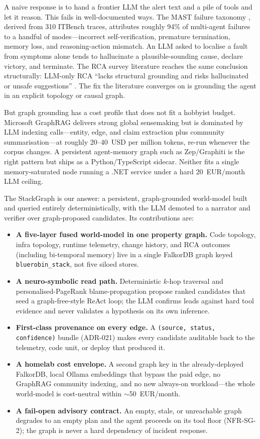 \documentclass[11pt]{article}
\begin{document}
A naive response is to hand a frontier LLM the alert text and a pile of tools
and let it reason. This fails in well-documented ways. The MAST failure taxonomy
\citep{cemri2025mast}, derived from 310 ITBench traces, attributes roughly 94\%
of multi-agent failures to a handful of modes---incorrect self-verification,
premature termination, memory loss, and reasoning-action mismatch. An LLM asked
to localise a fault from symptoms alone tends to hallucinate a plausible-sounding
cause, declare victory, and terminate. The RCA survey literature reaches the same
conclusion structurally: LLM-only RCA ``lacks structural grounding and risks
hallucinated or unsafe suggestions'' \citep{zhang2024survey}. The fix the
literature converges on is grounding the agent in an explicit topology or causal
graph.

But graph grounding has a cost profile that does not fit a hobbyist budget.
Microsoft GraphRAG \citep{edge2024graphrag} delivers strong global sensemaking
but is dominated by LLM indexing calls---entity, edge, and claim extraction plus
community summarisation---at roughly 20--40~USD per million tokens, re-run
whenever the corpus changes. A persistent agent-memory graph such as Zep/Graphiti
\citep{rasmussen2025zep} is the right pattern but ships as a Python/TypeScript
sidecar. Neither fits a single memory-saturated node running a .NET service under
a hard 20~EUR/month LLM ceiling.

The StackGraph is our answer: a persistent, graph-grounded world-model built and
queried entirely deterministically, with the LLM demoted to a narrator and
verifier over graph-proposed candidates. Its contributions are:

\begin{itemize}
  \item \textbf{A five-layer fused world-model in one property graph.} Code
  topology, infra topology, runtime telemetry, change history, and RCA outcomes
  (including bi-temporal memory) live in a single FalkorDB graph keyed
  \texttt{bluerobin\_stack}, not five siloed stores.
  \item \textbf{A neuro-symbolic read path.} Deterministic $k$-hop traversal and
  personalised-PageRank blame-propagation propose ranked candidates that seed a
  graph-free-style ReAct loop; the LLM confirms leads against hard tool evidence
  and never validates a hypothesis on its own inference.
  \item \textbf{First-class provenance on every edge.} A
  \texttt{(source, status, confidence)} bundle (ADR-021) makes every candidate
  auditable back to the telemetry, code unit, or deploy that produced it.
  \item \textbf{A homelab cost envelope.} A second graph key in the
  already-deployed FalkorDB, local Ollama embeddings that bypass the paid edge,
  no GraphRAG community indexing, and no new always-on workload---the whole
  world-model is cost-neutral within $\sim$50~EUR/month.
  \item \textbf{A fail-open advisory contract.} An empty, stale, or unreachable
  graph degrades to an empty plan and the agent proceeds on its tool floor
  (NFR-SG-2); the graph is never a hard dependency of incident response.
\end{itemize}
\end{document}
